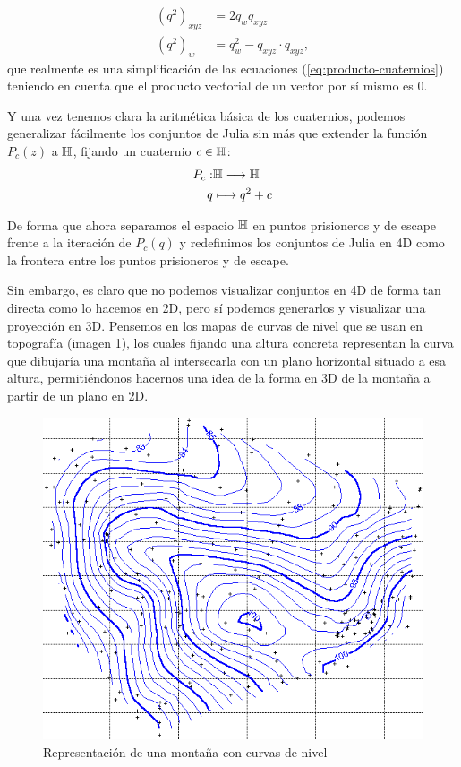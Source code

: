\begin{equation}
    \label{eq:cuadrado-cuaternio}
    \begin{split}
        (q^2)_{xyz} &= 2q_w q_{xyz} \\
        (q^2)_w &= q_w^2 - q_{xyz}\cdot q_{xyz},
    \end{split}
\end{equation}
que realmente es una simplificación de las ecuaciones (\ref{eq:producto-cuaternios}) teniendo en cuenta que el producto vectorial de un vector por sí mismo es $0$.

Y una vez tenemos clara la aritmética básica de los cuaternios, podemos generalizar fácilmente los conjuntos de Julia sin más que extender la función $P_c(z)$ a $\mathbb{H}$, fijando un cuaternio $c\in\mathbb{H}$:
\begin{equation}
    \label{eq:f-julia-cuaternios}
    \begin{split}
        P_c :& \mathbb{H} \longrightarrow \mathbb{H} \\
        q & \longmapsto q^2 + c
    \end{split}
\end{equation}

De forma que ahora separamos el espacio $\mathbb{H}$ en puntos prisioneros y de escape frente a la iteración de $P_c(q)$ y redefinimos los conjuntos de Julia en 4D como la frontera entre los puntos prisioneros y de escape. 

Sin embargo, es claro que no podemos visualizar conjuntos en 4D de forma tan directa como lo hacemos en 2D, pero sí podemos generarlos y visualizar una proyección en 3D. Pensemos en los mapas de curvas de nivel que se usan en topografía (imagen \ref{fig:curva-de-nivel}), los cuales fijando una altura concreta representan la curva que dibujaría una montaña al intersecarla con un plano horizontal situado a esa altura, permitiéndonos hacernos una idea de la forma en 3D de la montaña a partir de un plano en 2D. 

\begin{figure} [ht]
    \centering
    \includegraphics[scale = 0.3]{img/C8/curvas-de-nivel2.png}
    \caption{Representación de una montaña con curvas de nivel}
    \label{fig:curva-de-nivel}
\end{figure}

